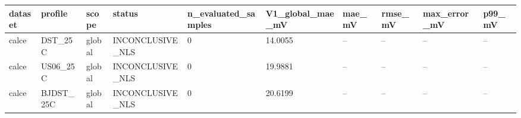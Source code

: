 \begin{tabular}{llllllllll}
\hline
dataset & profile & scope & status & n\_evaluated\_samples & V1\_global\_mae\_mV & mae\_mV & rmse\_mV & max\_error\_mV & p99\_mV \\
\hline
calce & DST\_25C & global & INCONCLUSIVE\_NLS & 0 & 14.0055 & -- & -- & -- & -- \\
calce & US06\_25C & global & INCONCLUSIVE\_NLS & 0 & 19.9881 & -- & -- & -- & -- \\
calce & BJDST\_25C & global & INCONCLUSIVE\_NLS & 0 & 20.6199 & -- & -- & -- & -- \\
\hline
\end{tabular}

